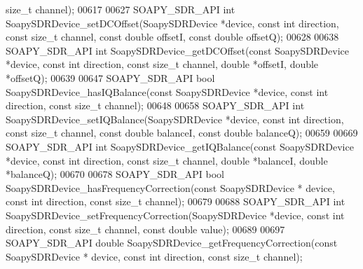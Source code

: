 \begin{DoxyCode}
{      size\_t} channel);
00617 
00627 SOAPY_SDR_API \textcolor{keywordtype}{int} SoapySDRDevice_setDCOffset(SoapySDRDevice *device, \textcolor{keyword}{const} \textcolor{keywordtype}{int} direction, \textcolor{keyword}{const} \textcolor{keywordtype}{size\_t} 
      channel, \textcolor{keyword}{const} \textcolor{keywordtype}{double} offsetI, \textcolor{keyword}{const} \textcolor{keywordtype}{double} offsetQ);
00628 
00638 SOAPY_SDR_API \textcolor{keywordtype}{int} SoapySDRDevice_getDCOffset(\textcolor{keyword}{const} SoapySDRDevice *device, \textcolor{keyword}{const} \textcolor{keywordtype}{int} direction, \textcolor{keyword}{const} \textcolor{keywordtype}{
      size\_t} channel, \textcolor{keywordtype}{double} *offsetI, \textcolor{keywordtype}{double} *offsetQ);
00639 
00647 SOAPY_SDR_API \textcolor{keywordtype}{bool} SoapySDRDevice_hasIQBalance(\textcolor{keyword}{const} SoapySDRDevice *device, \textcolor{keyword}{const} \textcolor{keywordtype}{int} direction, \textcolor{keyword}{const} \textcolor{keywordtype}{
      size\_t} channel);
00648 
00658 SOAPY_SDR_API \textcolor{keywordtype}{int} SoapySDRDevice_setIQBalance(SoapySDRDevice *device, \textcolor{keyword}{const} \textcolor{keywordtype}{int} direction, \textcolor{keyword}{const} \textcolor{keywordtype}{size\_t} 
      channel, \textcolor{keyword}{const} \textcolor{keywordtype}{double} balanceI, \textcolor{keyword}{const} \textcolor{keywordtype}{double} balanceQ);
00659 
00669 SOAPY_SDR_API \textcolor{keywordtype}{int} SoapySDRDevice_getIQBalance(\textcolor{keyword}{const} SoapySDRDevice *device, \textcolor{keyword}{const} \textcolor{keywordtype}{int} direction, \textcolor{keyword}{const} \textcolor{keywordtype}{
      size\_t} channel, \textcolor{keywordtype}{double} *balanceI, \textcolor{keywordtype}{double} *balanceQ);
00670 
00678 SOAPY_SDR_API \textcolor{keywordtype}{bool} SoapySDRDevice_hasFrequencyCorrection(\textcolor{keyword}{const} SoapySDRDevice *
      device, \textcolor{keyword}{const} \textcolor{keywordtype}{int} direction, \textcolor{keyword}{const} \textcolor{keywordtype}{size\_t} channel);
00679 
00688 SOAPY_SDR_API \textcolor{keywordtype}{int} SoapySDRDevice_setFrequencyCorrection(SoapySDRDevice *device, \textcolor{keyword}{const} \textcolor{keywordtype}{int} direction, \textcolor{keyword}{const} \textcolor{keywordtype}{
      size\_t} channel, \textcolor{keyword}{const} \textcolor{keywordtype}{double} value);
00689 
00697 SOAPY_SDR_API \textcolor{keywordtype}{double} SoapySDRDevice_getFrequencyCorrection(\textcolor{keyword}{const} SoapySDRDevice *
      device, \textcolor{keyword}{const} \textcolor{keywordtype}{int} direction, \textcolor{keyword}{const} \textcolor{keywordtype}{size\_t} channel);

\end{DoxyCode}

